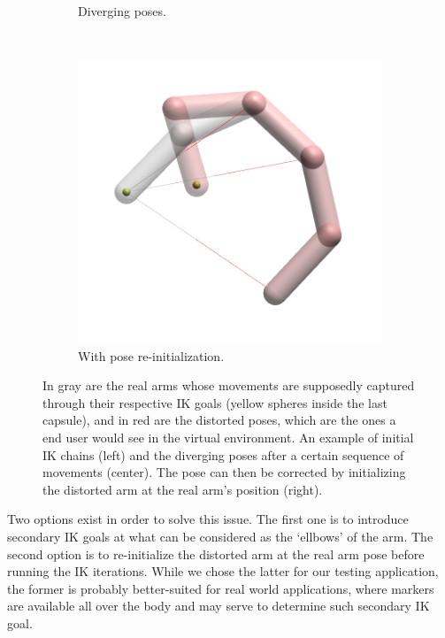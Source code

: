 \begin{figure}[h]
\begin{subfigure}[b]{0.3\textwidth}
        \caption{Diverging poses.}
        \label{subfig:divergence}
    \end{subfigure}
    ~
    \begin{subfigure}[b]{0.3\textwidth}
        \includegraphics[width=\textwidth]{Figures/arm_initDivergence.png}
        \caption{With pose re-initialization.}
        \label{subfig:initDivergence}
    \end{subfigure}
    \caption{In gray are the real arms whose movements are supposedly captured through their respective IK goals (yellow spheres inside the last capsule), and in red are the distorted poses, which are the ones a end user would see in the virtual environment. An example of initial IK chains (left) and the diverging poses after a certain sequence of movements (center). The pose can then be corrected by initializing the distorted arm at the real arm's position (right).}
    \label{fig:divergence}
\end{figure}

Two options exist in order to solve this issue. The first one is to introduce secondary IK goals at what can be considered as the `ellbows' of the arm. The second option is to re-initialize the distorted arm at the real arm pose before running the IK iterations. While we chose the latter for our testing application, the former is probably better-suited for real world applications, where markers are available all over the body and may serve to determine such secondary IK goal.